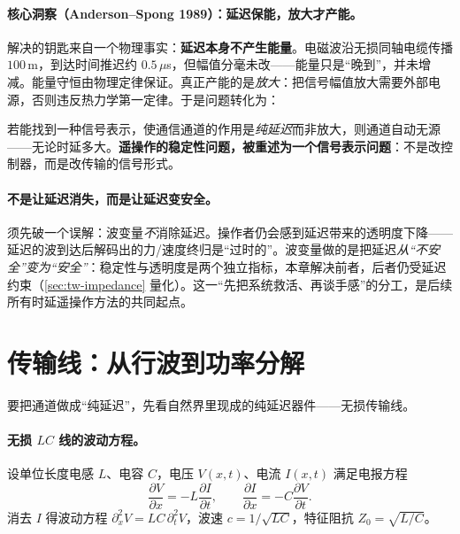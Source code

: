 \paragraph{核心洞察（Anderson--Spong 1989）：延迟保能，放大才产能。}
解决的钥匙来自一个物理事实\cite{anderson1989bilateral}：\textbf{延迟本身不产生能量}。电磁波沿无损同轴电缆传播 $100\,$m，到达时间推迟约 $0.5\,\mu$s，但幅值分毫未改——能量只是“晚到”，并未增减。能量守恒由物理定律保证。真正产能的是\emph{放大}：把信号幅值放大需要外部电源，否则违反热力学第一定律。于是问题转化为：

\begin{insight}
若能找到一种信号表示，使通信通道的作用是\emph{纯延迟}而非放大，则通道自动无源——无论时延多大。\textbf{遥操作的稳定性问题，被重述为一个信号表示问题}：不是改控制器，而是改传输的信号形式。
\end{insight}

\paragraph{不是让延迟消失，而是让延迟变安全。}
须先破一个误解：波变量\emph{不}消除延迟。操作者仍会感到延迟带来的透明度下降——延迟的波到达后解码出的力/速度终归是“过时的”。波变量做的是把延迟\emph{从“不安全”变为“安全”}：稳定性与透明度是两个独立指标，本章解决前者，后者仍受延迟约束（\cref{sec:tw-impedance} 量化）。这一“先把系统救活、再谈手感”的分工，是后续所有时延遥操作方法的共同起点。

\section{传输线：从行波到功率分解}
\label{sec:tw-transmissionline}

要把通道做成“纯延迟”，先看自然界里现成的纯延迟器件——无损传输线。

\paragraph{无损 $LC$ 线的波动方程。}
设单位长度电感 $L$、电容 $C$，电压 $V(x,t)$、电流 $I(x,t)$ 满足电报方程
\begin{equation}
  \frac{\partial V}{\partial x}=-L\frac{\partial I}{\partial t},\qquad
  \frac{\partial I}{\partial x}=-C\frac{\partial V}{\partial t}.
  \label{eq:tw-telegraph}
\end{equation}
消去 $I$ 得波动方程 $\partial^2_xV=LC\,\partial^2_tV$，波速 $c=1/\sqrt{LC}$，特征阻抗 $Z_0=\sqrt{L/C}$。

